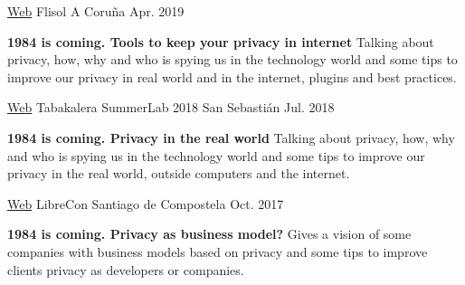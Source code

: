 


\begin{cventries}



\cventry
{\href{https://flisol2019acoruna.wordpress.com/}{Web}} %
{Flisol} %
{A Coruña} %
{Apr. 2019} %
{ %
\begin{cvitems}
\item {\textbf{1984 is coming. Tools to keep your privacy in internet} Talking about privacy, how, why and who is spying us in the technology world and some tips to improve our privacy in real world and in the internet, plugins and best practices.
}
\end{cvitems}
}



\cventry
{\href{https://www.tabakalera.eu/en/summerlab-2018-meeting-citizen-research-civic-use-of-technology}{Web}} %
{Tabakalera SummerLab 2018} %
{San Sebastián} %
{Jul. 2018} %
{ %
\begin{cvitems}
\item {\textbf{1984 is coming. Privacy in the real world} Talking about privacy, how, why and who is spying us in the technology world and some tips to improve our privacy in the real world, outside computers and the internet.
}
\end{cvitems}
}


\cventry
{\href{http://galicia2017.librecon.io/}{Web}} %
{LibreCon} %
{Santiago de Compostela} %
{Oct. 2017} %
{ %
\begin{cvitems}
\item {\textbf{1984 is coming. Privacy as business model?} Gives a vision of some companies with business models based on privacy and some tips to improve clients privacy as developers or companies.}
\end{cvitems}
}


\end{cventries}
